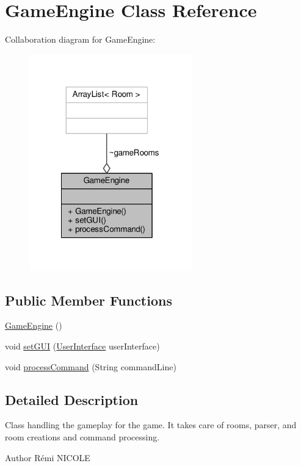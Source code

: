 \hypertarget{classGameEngine}{\section{Game\-Engine Class Reference}
\label{classGameEngine}
}


Collaboration diagram for Game\-Engine\-:
\nopagebreak
\begin{figure}[H]
\begin{center}
\leavevmode
\includegraphics[width=200pt]{classGameEngine__coll__graph}
\end{center}
\end{figure}
\subsection*{Public Member Functions}
\begin{DoxyCompactItemize}
\item 
\hyperlink{classGameEngine_a9e8a92f5021a34293060f9aaff4005de}{Game\-Engine} ()
\item 
void \hyperlink{classGameEngine_aec901a5b590b3cd204f196165da5dfb6}{set\-G\-U\-I} (\hyperlink{classUserInterface}{User\-Interface} user\-Interface)
\item 
void \hyperlink{classGameEngine_ad7133885f313fa99bca3bb7cb8272f64}{process\-Command} (String command\-Line)
\end{DoxyCompactItemize}


\subsection{Detailed Description}
Class handling the gameplay for the game. It takes care of rooms, parser, and room creations and command processing. \begin{DoxyAuthor}{Author}
Rémi N\-I\-C\-O\-L\-E 
\end{DoxyAuthor}


